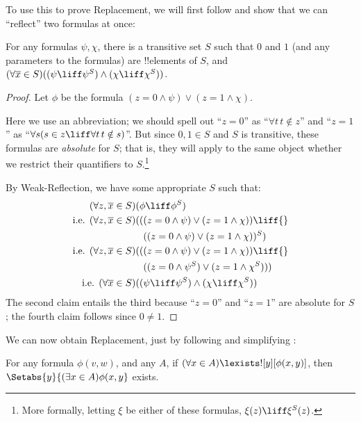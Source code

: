 \documentclass[../../../include/open-logic-section]{subfiles}
\begin{document}
To use this to prove Replacement, we will first follow \cite[first
part of Theorem 2]{Levy1960} and show that we can ``reflect'' two
formulas at once:

\begin{lem}
For any formulas $\psi, \chi$, there is a transitive set $S$ such that
$0$ and $1$ (and any parameters to the formulas) are !!{element}s of
$S$, and $(\forall \overline{x} \in S)((\psi \liff \psi^S) \land (\chi
\liff \chi^S))$.
\end{lem}

\begin{proof}
Let $\phi$ be the formula $(z = 0 \land \psi) \lor (z = 1 \land \chi)$. 

Here we use an abbreviation; we should spell out ``$z = 0$'' as
``$\forall t\, t \notin z$'' and ``$z =1$'' as ``$\forall s(s \in z
\liff \forall t\, t \notin s)$''. But since $0, 1 \in S$ and $S$ is
transitive, these formulas are \emph{absolute} for $S$; that is, they
will apply to the same object whether we restrict their quantifiers to
$S$.\footnote{More formally, letting $\xi$ be either of these
formulas, $\xi(z) \liff \xi^S(z)$.}

By Weak-Reflection, we have some appropriate $S$ such that:
\begin{align*}
	(\forall z, \overline{x} \in S)(&\phi \liff \phi^S)\\
	\text{i.e. }(\forall z, \overline{x} \in S)(&((z = 0 \land \psi) \lor (z = 1 \land \chi)) \liff {}\\
	&\phantom{(}((z = 0 \land \psi) \lor (z = 1 \land \chi))^S)\\
	\text{i.e. }(\forall z, \overline{x} \in S)(&((z = 0 \land \psi) \lor (z = 1 \land \chi))\liff {}\\
	&\phantom{(}((z = 0 \land \psi^S) \lor (z = 1 \land \chi^S)))\\
	\text{i.e. }(\forall \overline{x} \in S)(&(\psi \liff \psi^S) \land (\chi \liff \chi^S))
\end{align*}
The second claim entails the third because ``$z = 0$'' and ``$z=1$''
are absolute for $S$; the fourth claim follows since $0 \neq 1$.
\end{proof}\noindent We can now obtain Replacement, just by following and simplifying 
\cite[Theorem 6]{Levy1960}:

\begin{thm}\label{thm:replacement} 
For any formula $\phi(v,w)$, and any $A$, if $(\forall x \in A)\lexists![y][\phi(x,y)]$, then
$\Setabs{y}{(\exists x \in A)\phi(x,y}$ exists.
\end{thm}
\end{document}
